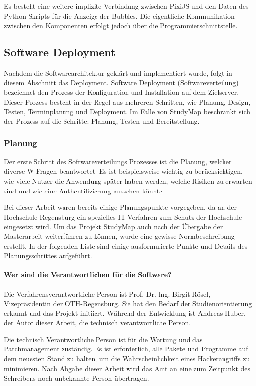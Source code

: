 Es besteht eine weitere implizite Verbindung zwischen PixiJS und den Daten des Python-Skripts für die Anzeige der Bubbles. Die eigentliche Kommunikation zwischen den Komponenten erfolgt jedoch über die Programmierschnittstelle.

\subsection{Software Deployment}\label{sec:deployment}
Nachdem die Softwarearchitektur geklärt und implementiert wurde, folgt in diesem Abschnitt das Deployment. Software Deployment (Softwareverteilung) bezeichnet den Prozess der Konfiguration und Installation auf dem Zielserver. Dieser Prozess besteht in der Regel aus mehreren Schritten, wie Planung, Design, Testen, Terminplanung und Deployment. \parencite{atera_team_was_2023} Im Falle von StudyMap beschränkt sich der Prozess auf die Schritte: Planung, Testen und Bereitstellung.

\subsubsection{Planung}
Der erste Schritt des Softwareverteilungs Prozesses ist die Planung, welcher diverse W-Fragen beantwortet. Es ist beispielsweise wichtig zu berücksichtigen, wie viele Nutzer die Anwendung später haben werden, welche Risiken zu erwarten sind und wie eine Authentifizierung aussehen könnte. \parencite{atera_team_was_2023}

Bei dieser Arbeit waren bereits einige Planungspunkte vorgegeben, da an der Hochschule Regensburg ein spezielles IT-Verfahren zum Schutz der Hochschule eingesetzt wird. Um das Projekt StudyMap auch nach der Übergabe der Masterarbeit weiterführen zu können, wurde eine gewisse Normbeschreibung erstellt. In der folgenden Liste sind einige ausformulierte Punkte und Details des Planungsschrittes aufgeführt.

\paragraph*{Wer sind die Verantwortlichen für die Software?}
Die Verfahrensverantwortliche Person ist Prof. Dr.-Ing. Birgit Rösel, Vizepräsidentin der OTH-Regensburg. Sie hat den Bedarf der Studienorientierung erkannt und das Projekt initiiert. Während der Entwicklung ist Andreas Huber, der Autor dieser Arbeit, die technisch verantwortliche Person.

Die technisch Verantwortliche Person ist für die Wartung und das Patchmanagement zuständig. Es ist erforderlich, alle Pakete und Programme auf dem neuesten Stand zu halten, um die Wahrscheinlichkeit eines Hackerangriffs zu minimieren. Nach Abgabe dieser Arbeit wird das Amt an eine zum Zeitpunkt des Schreibens noch unbekannte Person übertragen.


